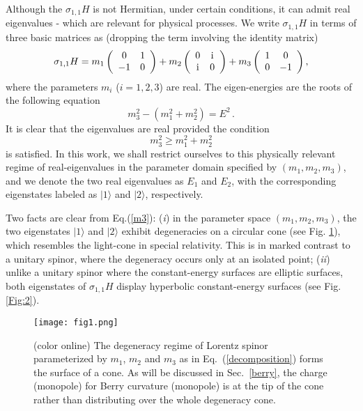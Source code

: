 \documentclass[pra,epsfig,rotate,superscriptaddress,showpacs]{revtex4}
\begin{document}
Although the $\sigma_{1,1} H$ is not Hermitian,  under certain conditions, it can admit real eigenvalues - which are relevant for physical processes. We write $\sigma_{1,1} H$ in terms
of three basic matrices as (dropping the term involving the identity matrix)
\begin{equation} \label{decomposition}
\sigma_{1,1}H=m_1\left(\begin{array}{cc}0&1 \\ -1&0\end{array} \right)+m_2\left(\begin{array}{cc}0&{\text i} \\ {\text i}&0\end{array} \right)+m_3\left(\begin{array}{cc}1&0 \\ 0&-1\end{array} \right),
\end{equation}
where the parameters $m_i$ ($i=1,2,3$) are real. The eigen-energies  are  the
roots of the following equation
\begin{equation}
\label{m3}
m_3^2-(m_1^2+m_2^2)=E^2\,.
\end{equation}
It is clear that the eigenvalues are real provided the condition
\begin{equation} \label{first-condition}
m_3^2\geq m_1^2+m_2^2
\end{equation}
is satisfied. In this work, we shall restrict ourselves to this physically relevant
regime of real-eigenvalues in the parameter domain specified by $(m_1,m_2,m_3)$,
and we denote the two real eigenvalues as $E_1$ and $E_2$, with the corresponding
eigenstates labeled as $|1\rangle$ and $|2\rangle$, respectively.

Two facts are clear from Eq.(\ref{m3}): ({\it i}) in the parameter space $(m_1,m_2,m_3)$, the two eigenstates $|1\rangle$ and $|2\rangle$ exhibit degeneracies on a circular cone (see Fig. \ref{Fig:1}), which resembles the light-cone in special relativity. This is in marked contrast to a unitary spinor,
where the degeneracy occurs only at an isolated point; ({\it ii}) unlike a unitary spinor where the constant-energy surfaces are  elliptic surfaces, both eigenstates of $\sigma_{1,1}H$ display hyperbolic constant-energy surfaces (see Fig. \ref{Fig:2}).

\begin{figure}%
\texttt{[image: fig1.png]}
\caption{(color online) The degeneracy regime of Lorentz spinor parameterized by $m_1$, $m_2$ and $m_3$ as in Eq.~(\ref{decomposition}) forms the surface of a cone. As will be discussed in
Sec.~\ref{berry}, the charge (monopole) for Berry curvature (monopole) is at the tip of the cone rather than distributing over the whole degeneracy cone.}
\label{Fig:1}
\end{figure}
\end{document}
